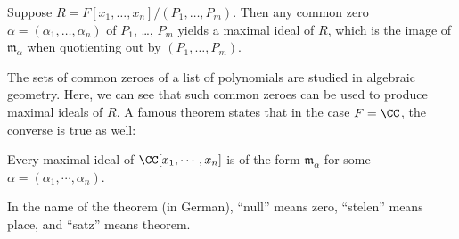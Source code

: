 \begin{proposition}
Suppose $R = F[x_1, \ldots, x_n]/(P_1, \ldots, P_m)$. Then any common zero $\alpha = (\alpha_1, \ldots, \alpha_n)$ of $P_1$, \ldots, $P_m$ yields a maximal ideal of $R$, which is the image of $\mathfrak{m}_\alpha$ when quotienting out by $(P_1, \ldots, P_m)$. 
\end{proposition}

The sets of common zeroes of a list of polynomials are studied in algebraic geometry. Here, we can see that such common zeroes can be used to produce maximal ideals of $R$. A famous theorem states that in the case $F = \CC$, the converse is true as well:





\begin{theorem}\label{nullstelensatz}
Every maximal ideal of $\CC[x_1, \cdots, x_n]$ is of the form $\mathfrak{m}_{\alpha}$ for some $\alpha = (\alpha_1, \cdots, \alpha_n)$.
\end{theorem}

In the name of the theorem (in German), ``null'' means zero, ``stelen'' means place, and ``satz'' means theorem.

